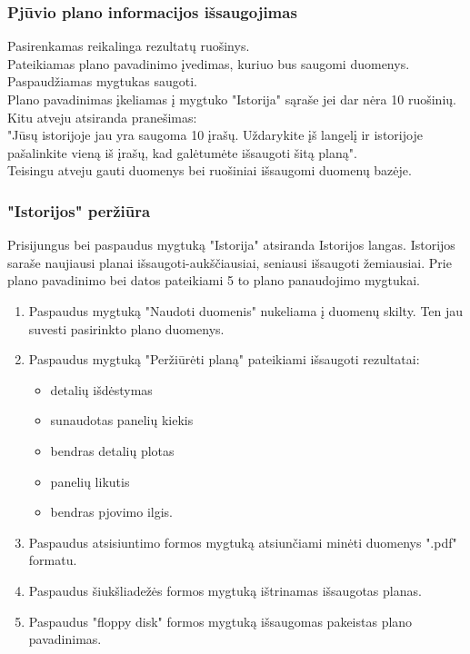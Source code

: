 \documentclass[a4paper,12pt]{article}
\begin{document}
\subsubsection{Pjūvio plano informacijos išsaugojimas}
Pasirenkamas reikalinga rezultatų ruošinys. \\
Pateikiamas plano pavadinimo įvedimas, kuriuo bus saugomi duomenys. \\
Paspaudžiamas mygtukas saugoti. \\
Plano pavadinimas įkeliamas į mygtuko "Istorija" sąraše jei dar nėra 10 ruošinių.\\
Kitu atveju atsiranda pranešimas: \\
"Jūsų istorijoje jau yra saugoma 10 įrašų. Uždarykite įš langelį ir istorijoje pašalinkite vieną iš įrašų, kad galėtumėte išsaugoti šitą planą". \\
Teisingu atveju gauti duomenys bei ruošiniai išsaugomi duomenų bazėje.

\subsubsection{"Istorijos" peržiūra}
Prisijungus bei paspaudus mygtuką "Istorija" atsiranda Istorijos langas.
Istorijos saraše naujiausi planai išsaugoti-aukščiausiai, seniausi išsaugoti žemiausiai.
Prie plano pavadinimo bei datos pateikiami 5 to plano panaudojimo mygtukai.
\begin{enumerate}
	\item Paspaudus mygtuką "Naudoti duomenis" nukeliama į duomenų skilty.
		Ten jau suvesti pasirinkto plano duomenys.
	\item Paspaudus mygtuką "Peržiūrėti planą" pateikiami išsaugoti rezultatai:
		\begin{itemize}
			\item detalių išdėstymas
			\item sunaudotas panelių kiekis
			\item bendras detalių plotas
			\item panelių likutis
			\item bendras pjovimo ilgis.
		\end{itemize}
	\item Paspaudus atsisiuntimo formos mygtuką atsiunčiami minėti duomenys ".pdf" formatu.
	\item Paspaudus šiukšliadežės formos mygtuką ištrinamas išsaugotas planas.
	\item Paspaudus "floppy disk" formos mygtuką išsaugomas pakeistas plano pavadinimas.
\end{enumerate}
\clearpage
\end{document}
